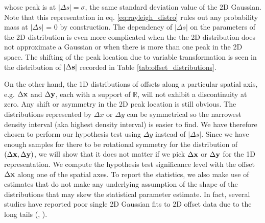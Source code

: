 whose peak is at $|\Delta s| = \sigma$, the same standard deviation value of the 2D
Gaussian. Note that this representation in  
eq. \ref{eq:rayleigh_distro}
rules out any probability mass at $|\Delta s|$ = 0 by construction. 
The dependency of $|\Delta s|$ on the parameters of
the 2D distribution is even more
complicated when the the 2D distribution does not approximate a Gaussian 
or when there is more than one peak in the 2D space. 
The shifting of the peak location due to variable transformation 
is seen in the distribution of $|\Delta {\bf s}|$ recorded in Table
\ref{tab:offset_distributions}.

On the other hand, 
the 1D distributions of offsets along a particular spatial axis, 
e.g. $\Delta {\bf x}$ and $\Delta {\bf y}$,
each with a support of $\mathbb{R}$, will not exhibit a discontinuity at zero.
Any shift or asymmetry in the 2D peak location is still obvious. 
The distributions represented by $\Delta x$ or $\Delta y$ 
can be symmetrical so 
the narrowest density interval (aka highest density interval) is easier to find.
We have therefore chosen to perform our hypothesis test using $\Delta y$
instead of $|\Delta s|$.
Since we have enough samples for there to be
rotational symmetry for the distribution of $(\Delta {\bf x}, \Delta {\bf y})$,
we will show that it does not
matter if we pick $\Delta {\bf x}$ or $\Delta {\bf y}$ for the 1D representation.
We compute the hypothesis test significance level with the 
 offset $\Delta {\bf x}$ along one of the spatial axes. 
To report the statistics, we also make use of estimates that do not make any
underlying assumption of the shape of the distributions that may skew the
statistical parameter estimate.
In fact, several studies have reported poor single 2D Gaussian fits to 2D offset data
due to the long tails
(\citealt{Zitrin2012a}, \citealt{Oguri2010}).  

